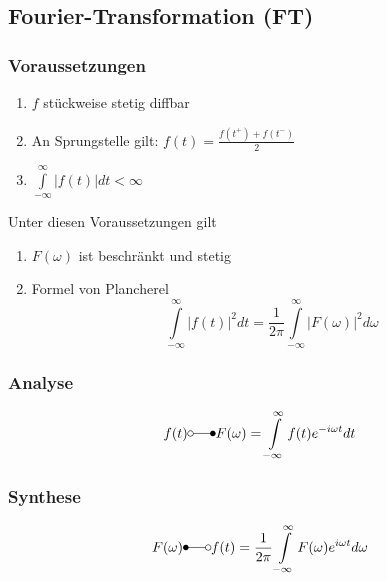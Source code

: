 \documentclass[a4paper,twocolumn,10pt]{article}
\begin{document}
\subsection{Fourier-Transformation (FT)}

\subsubsection{Voraussetzungen}
\begin{enumerate}
\item $f$ stückweise stetig diffbar
\item An Sprungstelle gilt: $f(t)=\frac{f(t^+)+f(t^-)}{2}$
\item $\int\limits_{-\infty}^{\infty}|f(t)|dt<\infty$
\end{enumerate}
Unter diesen Voraussetzungen gilt
\begin{enumerate}[label=$\bullet$]
\item $F(\omega)$ ist beschränkt und stetig
\item Formel von Plancherel
\begin{equation*}
\int\limits_{-\infty}^{\infty}|f(t)|^2dt=\frac{1}{2\pi}\int\limits_{-\infty}^{\infty}|F(\omega)|^2d\omega
\end{equation*}
\end{enumerate}

\subsubsection{Analyse}
\begin{equation*}
f(t)\laplace F(\omega)=\int\limits_{-\infty}^{\infty}f(t)e^{-i\omega t}dt
\end{equation*}

\subsubsection{Synthese}
\begin{equation*}
F(\omega)\Laplace f(t)=\frac{1}{2\pi}\int\limits_{-\infty}^{\infty}F(\omega)e^{i\omega t}d\omega
\end{equation*}
\end{document}

